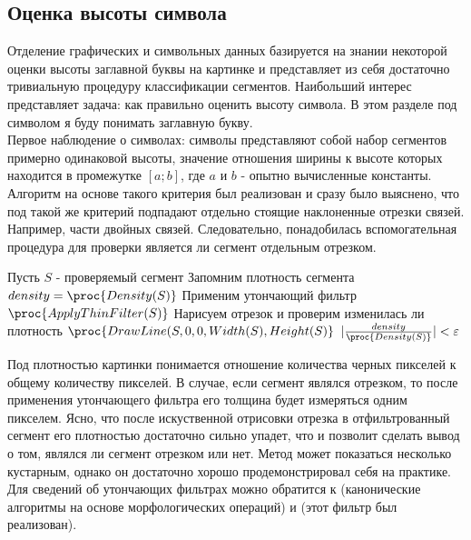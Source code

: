 \subsection{Оценка высоты символа}
\label{subsec:capheight}

\noindent
Отделение графических и символьных данных базируется на знании некоторой оценки высоты заглавной буквы на картинке и представляет из себя
достаточно тривиальную процедуру классификации сегментов. Наибольший интерес представляет задача: как правильно оценить высоту символа. В
этом разделе под символом я буду понимать заглавную букву. \\

\noindent
Первое наблюдение о символах: символы представляют собой набор сегментов примерно одинаковой высоты, значение отношения ширины к высоте которых
находится в промежутке $[a;b]$, где $a$ и $b$ - опытно вычисленные константы. Алгоритм на основе такого критерия был реализован и 
сразу было выяснено, что под такой же критерий подпадают отдельно стоящие наклоненные отрезки связей. Например, части двойных связей. 
Следовательно, понадобилась вспомогательная процедура для проверки является ли сегмент отдельным отрезком.

\begin{codebox}
  \li \Comment Пусть $S$ - проверяемый сегмент
  \li
  \li \Comment Запомним плотность сегмента
  \li $density = \proc{Density(S)}$
  \li
  \li \Comment Применим утончающий фильтр
  \li $\proc{ApplyThinFilter(S)}$
  \li
  \li \Comment Нарисуем отрезок и проверим изменилась ли плотность
  \li $\proc{DrawLine(S, 0, 0, Width(S), Height(S)}$
  \li
  \li \If $|\frac{density}{\proc{Density(S)}}| < \varepsilon$
  \li \Then \Return {} \End
  \li \Return {}
\end{codebox}

\noindent
Под плотностью картинки понимается отношение количества черных пикселей к общему количеству пикселей. В случае, если сегмент являлся отрезком, то
после применения утончающего фильтра его толщина будет измеряться одним пикселем. Ясно, что после искуственной отрисовки отрезка в отфильтрованный 
сегмент его плотностью достаточно сильно упадет, что и позволит сделать вывод о том, являлся ли сегмент отрезком или нет. Метод может показаться
несколько кустарным, однако он достаточно хорошо продемонстрировал себя на практике. Для сведений об утончающих фильтрах можно обратится к 
\cite{gonzalez} (канонические алгоритмы на основе морфологических операций) и \cite{cychosz} (этот фильтр был реализован). \\

